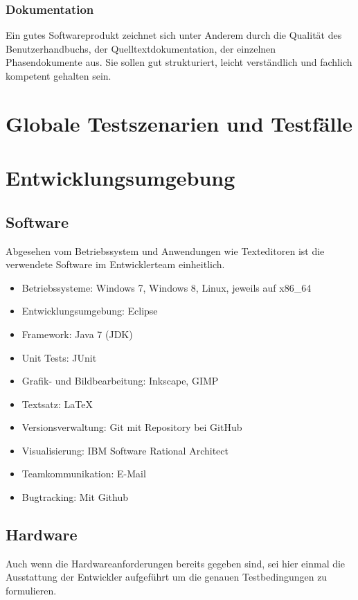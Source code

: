 \documentclass[10pt]{scrreprt}
\begin{document}
\subsection*{Dokumentation}
Ein gutes Softwareprodukt zeichnet sich unter Anderem durch die Qualität des Benutzerhandbuchs, der Quelltextdokumentation, der einzelnen Phasendokumente aus. Sie sollen gut strukturiert, leicht verständlich und fachlich kompetent gehalten sein. 




\chapter{Globale Testszenarien und Testfälle}





\chapter{Entwicklungsumgebung}
\section{Software}
Abgesehen vom Betriebssystem und Anwendungen wie Texteditoren ist die verwendete Software im Entwicklerteam einheitlich.
\begin{itemize}
\item Betriebssysteme: Windows 7, Windows 8, Linux, jeweils auf x86{\_}64
\item Entwicklungsumgebung: Eclipse
\item Framework: Java 7 (JDK)
\item Unit Tests: JUnit
\item Grafik- und Bildbearbeitung: Inkscape, GIMP
\item Textsatz: \LaTeX
\item Versionsverwaltung: Git mit Repository bei GitHub
\item Visualisierung: IBM Software Rational Architect
\item Teamkommunikation: E-Mail
\item Bugtracking: Mit Github
\end{itemize}


\section{Hardware}
Auch wenn die Hardwareanforderungen bereits gegeben sind, sei hier einmal die Ausstattung der Entwickler aufgeführt um die genauen Testbedingungen zu formulieren.
\end{document}

